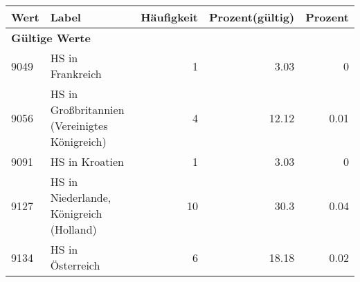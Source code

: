      \begin{longtable}{lXrrr}
     \toprule
     \textbf{Wert} & \textbf{Label} & \textbf{Häufigkeit} & \textbf{Prozent(gültig)} & \textbf{Prozent} \\
     \endhead
     \midrule
     \multicolumn{5}{l}{\textbf{Gültige Werte}}\\

     9049 &
     \multicolumn{1}{X}{ HS in Frankreich   } &


       \num{1} &
       \num[round-mode=places,round-precision=2]{3.03} &
         \num[round-mode=places,round-precision=2]{0} \\

     9056 &
     \multicolumn{1}{X}{ HS in Großbritannien (Vereinigtes Königreich)   } &


       \num{4} &
       \num[round-mode=places,round-precision=2]{12.12} &
         \num[round-mode=places,round-precision=2]{0.01} \\

     9091 &
     \multicolumn{1}{X}{ HS in Kroatien   } &


       \num{1} &
       \num[round-mode=places,round-precision=2]{3.03} &
         \num[round-mode=places,round-precision=2]{0} \\

     9127 &
     \multicolumn{1}{X}{ HS in Niederlande, Königreich (Holland)   } &


       \num{10} &
       \num[round-mode=places,round-precision=2]{30.3} &
         \num[round-mode=places,round-precision=2]{0.04} \\

     9134 &
     \multicolumn{1}{X}{ HS in Österreich   } &


       \num{6} &
       \num[round-mode=places,round-precision=2]{18.18} &
         \num[round-mode=places,round-precision=2]{0.02} \\


\end{longtable}

